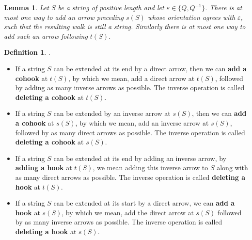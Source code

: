 \documentclass[12pt]{amsart}
\theoremstyle{plain}
\newtheorem{lem}[thm]{Lemma}
\theoremstyle{definition}
\newtheorem{defn}{Definition}[section]
\theoremstyle{remark}
\begin{document}
\begin{lem}
Let $S$ be a string of positive length and let $\varepsilon \in \{ Q, Q^{-1} \}$. There is at most one way to add an arrow preceding $s(S)$ whose orientation agrees with $\varepsilon$, such that the resulting walk is still a string. Similarly there is at most one way to add such an arrow following $t(S)$.
\end{lem}


\begin{defn} {\color{white} .}

    \begin{itemize}
        \item If a string $S$ can be extended at its end by a direct arrow, then we can \textbf{add a cohook} at $t(S)$, by which we mean, add a direct arrow at $t(S)$, followed by adding as many inverse arrows as possible. The inverse operation is called \textbf{deleting a cohook} at $t(S)$.

        \item If a string $S$ can be extended by an inverse arrow at $s(S)$, then we can \textbf{add a cohook} at $s(S)$, by which we mean, add an inverse arrow at $s(S)$, followed by as many direct arrows as possible. The inverse operation is called \textbf{deleting a cohook} at $s(S)$.

        \item If a string $S$ can be extended at its end by adding an inverse arrow, by \textbf{adding a hook} at $t(S)$, we mean adding this inverse arrow to $S$ along with as many direct arrows as possible. The inverse operation is called \textbf{deleting a hook} at $t(S)$.

        \item If a string $S$ can be extended at its start by a direct arrow, we can \textbf{add a hook} at $s(S)$, by which we mean, add the direct arrow at $s(S)$ followed by as many inverse arrows as possible. The inverse operation is called \textbf{deleting a hook} at $s(S)$.

    \end{itemize}
\end{defn}
\end{document}
